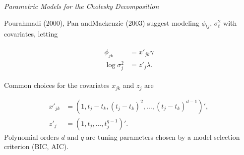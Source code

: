 \begin{frame}{\emph{Parametric Models for the Cholesky Decomposition}}{} \label{polynomial-mcd-model}

Pourahmadi (2000), Pan andMackenzie (2003) suggest modeling $\phi_{tj}$, $\sigma^2_{t}$ with covariates, letting 

\begin{align*}
\begin{split}  \label{eq:GARP-IV-parametric-model}
\phi_{jk} &= x'_{jk} \gamma \\
\log \sigma^2_{j} &= z'_{j}\lambda. 
\end{split}
\end{align*}

Common choices for the covariates $x_{jk}$ and $z_j$ are

\begin{align*}
x'_{jk} &= \left(1, t_j - t_k, \left(t_j - t_k\right)^2,\dots, \left(t_j - t_k\right)^{d-1}\right)', \\
z'_{j}  &= \left(1, t_j, \dots, t_j^{q-1}\right)'.
\end{align*} \label{eq:mcd-polynomial-model}
\noindent
Polynomial orders $d$ and $q$ are tuning parameters chosen by a model selection criterion (BIC, AIC).
\vspace{1cm}

\hyperlink{simulation-studies-benchmark-estimators}{}

\end{frame}

